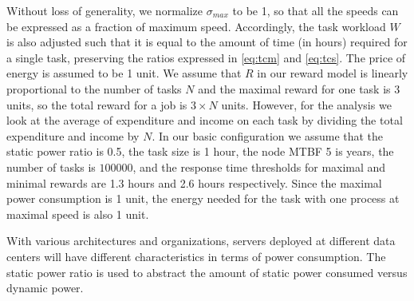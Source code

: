 Without loss of generality, we normalize $\sigma_{max}$ to be 1, so
that all the speeds can be expressed as a fraction of maximum
speed. Accordingly, the task workload $W$ is also adjusted such that
it is equal to the amount of time (in hours) required for a single
task, preserving the ratios expressed in
\ref{eq:tcm} and \ref{eq:tcs}. The price of
energy is assumed to be 1 unit. We assume that $R$ in our reward model
is linearly proportional to the number of tasks $N$ and the maximal
reward for one task is 3 units, so the total reward for a job is $3
\times N$ units.  However, for the analysis we look
at the average of expenditure and income on each task by dividing the
total expenditure and income by $N$. In our basic configuration we
assume that the static power ratio is 0.5, the task size is 1 hour, the node MTBF 5 is
years, the number of tasks is $100000$, and the response time thresholds for
maximal and minimal rewards are 1.3 hours and 2.6 hours
respectively. Since the maximal power consumption is 1 unit, the
energy needed for the task with one process at maximal speed is also 1
unit. 


With various architectures and organizations, servers deployed at
different data centers will have different characteristics in terms of
power consumption. The static power ratio is used to abstract the
amount of static power consumed versus dynamic power.  


